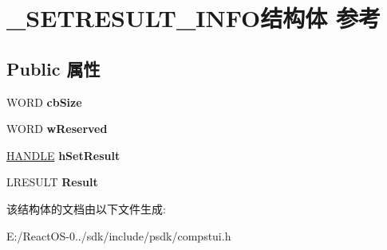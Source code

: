 \hypertarget{struct___s_e_t_r_e_s_u_l_t___i_n_f_o}{}\section{\+\_\+\+S\+E\+T\+R\+E\+S\+U\+L\+T\+\_\+\+I\+N\+F\+O结构体 参考}
\label{struct___s_e_t_r_e_s_u_l_t___i_n_f_o}
\subsection*{Public 属性}
\begin{DoxyCompactItemize}
\item 
\mbox{\label{struct___s_e_t_r_e_s_u_l_t___i_n_f_o_a5ab91cac8104715048e1dcbc7dfd14af}} 
W\+O\+RD {\bfseries cb\+Size}
\item 
\mbox{\label{struct___s_e_t_r_e_s_u_l_t___i_n_f_o_aac2079801cf8d7a68e86871c57cde189}} 
W\+O\+RD {\bfseries w\+Reserved}
\item 
\mbox{\label{struct___s_e_t_r_e_s_u_l_t___i_n_f_o_aa52ab0cc87b41826bda7d88b9b2a527b}} 
\hyperlink{interfacevoid}{H\+A\+N\+D\+LE} {\bfseries h\+Set\+Result}
\item 
\mbox{\label{struct___s_e_t_r_e_s_u_l_t___i_n_f_o_a49ebc9ecacaaf92d6f84c683dfb77829}} 
L\+R\+E\+S\+U\+LT {\bfseries Result}
\end{DoxyCompactItemize}


该结构体的文档由以下文件生成\+:\begin{DoxyCompactItemize}
\item 
E\+:/\+React\+O\+S-\/0../sdk/include/psdk/compstui.\+h\end{DoxyCompactItemize}
